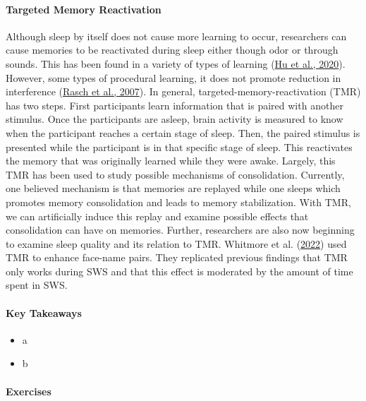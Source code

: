 \documentclass[
]{krantz}
\providecommand{\tightlist}{%
  \setlength{\itemsep}{0pt}\setlength{\parskip}{0pt}}
\begin{document}
\hypertarget{targeted-memory-reactivation}{%
\paragraph*{Targeted Memory Reactivation}\label{targeted-memory-reactivation}}

Although sleep by itself does not cause more learning to occur, researchers can cause memories to be reactivated during sleep either though odor or through sounds. This has been found in a variety of types of learning (\protect\hyperlink{ref-Hu2020}{Hu et al., 2020}). However, some types of procedural learning, it does not promote reduction in interference (\protect\hyperlink{ref-Rasch2007}{Rasch et al., 2007}). In general, targeted-memory-reactivation (TMR) has two steps. First participants learn information that is paired with another stimulus. Once the participants are asleep, brain activity is measured to know when the participant reaches a certain stage of sleep. Then, the paired stimulus is presented while the participant is in that specific stage of sleep. This reactivates the memory that was originally learned while they were awake. Largely, this TMR has been used to study possible mechanisms of consolidation. Currently, one believed mechanism is that memories are replayed while one sleeps which promotes memory consolidation and leads to memory stabilization. With TMR, we can artificially induce this replay and examine possible effects that consolidation can have on memories. Further, researchers are also now beginning to examine sleep quality and its relation to TMR. Whitmore et al. (\protect\hyperlink{ref-Whitmore2022}{2022}) used TMR to enhance face-name pairs. They replicated previous findings that TMR only works during SWS and that this effect is moderated by the amount of time spent in SWS.

\hypertarget{key-takeaways-4}{%
\paragraph*{Key Takeaways}\label{key-takeaways-4}}

\begin{itemize}
\tightlist
\item
  a
\item
  b
\end{itemize}

\hypertarget{exercises-4}{%
\paragraph*{Exercises}\label{exercises-4}}
\end{document}
